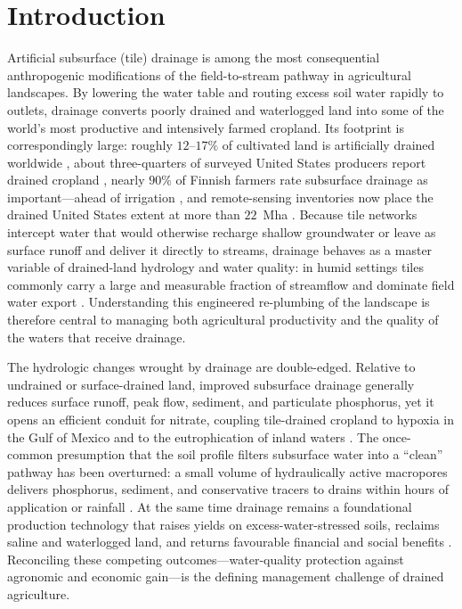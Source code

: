 \section{Introduction}

Artificial subsurface (tile) drainage is among the most consequential
anthropogenic modifications of the field-to-stream pathway in agricultural
landscapes. By lowering the water table and routing excess soil water rapidly
to outlets, drainage converts poorly drained and waterlogged land into some of
the world's most productive and intensively farmed cropland. Its footprint is
correspondingly large: roughly $12$--$17\%$ of cultivated land is artificially
drained worldwide \parencite{Valipour2014}, about three-quarters of surveyed
United States producers report drained cropland \parencite{Morton2015}, nearly
$90\%$ of Finnish farmers rate subsurface drainage as important---ahead of
irrigation \parencite{PeltonenSainio2021}, and remote-sensing inventories now
place the drained United States extent at more than $22$~Mha
\parencite{Valayamkunnath2020}. Because tile networks intercept water that would
otherwise recharge shallow groundwater or leave as surface runoff and deliver it
directly to streams, drainage behaves as a master variable of drained-land
hydrology and water quality: in humid settings tiles commonly carry a large and
measurable fraction of streamflow and dominate field water export
\parencite{King2014,Williams2018,Schilling2019}. Understanding this engineered
re-plumbing of the landscape is therefore central to managing both agricultural
productivity and the quality of the waters that receive drainage.

The hydrologic changes wrought by drainage are double-edged. Relative to
undrained or surface-drained land, improved subsurface drainage generally
reduces surface runoff, peak flow, sediment, and particulate phosphorus, yet it
opens an efficient conduit for nitrate, coupling tile-drained cropland to
hypoxia in the Gulf of Mexico and to the eutrophication of inland waters
\parencite{FAUSEY1995,SKAGGS1994,THOMAS1995,Gramlich2018,Raymond2012}. The
once-common presumption that the soil profile filters subsurface water into a
``clean'' pathway has been overturned: a small volume of hydraulically active
macropores delivers phosphorus, sediment, and conservative tracers to drains
within hours of application or rainfall \parencite{Pease2018}. At the
same time drainage remains a foundational production technology that raises
yields on excess-water-stressed soils, reclaims saline and waterlogged land, and
returns favourable financial and social benefits \parencite{Singh2022b,Yang2025}.
Reconciling these competing outcomes---water-quality protection against
agronomic and economic gain---is the defining management challenge of drained
agriculture.

